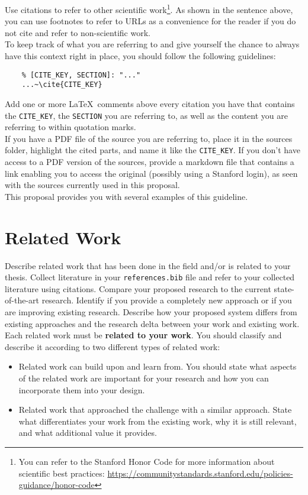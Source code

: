 \begin{tcolorbox}
	Use citations to refer to other scientific work\footnote{You can refer to the Stanford Honor Code for more information about scientific best practices: \url{https://communitystandards.stanford.edu/policies-guidance/honor-code}}.
	As shown in the sentence above, you can use footnotes to refer to URLs as a convenience for the reader if you do not cite and refer to non-scientific work.
	\\
	To keep track of what you are referring to and give yourself the chance to always have this context right in place, you should follow the following guidelines:
	\begin{verbatim}
	% [CITE_KEY, SECTION]: "..."
	...~\cite{CITE_KEY}
	\end{verbatim}
	Add one or more \LaTeX~comments above every citation you have that contains the \texttt{CITE\_KEY}, the \texttt{SECTION} you are referring to, as well as the content you are referring to within quotation marks.
	\\
	If you have a PDF file of the source you are referring to, place it in the sources folder, highlight the cited parts, and name it like the \texttt{CITE\_KEY}.
	If you don't have access to a PDF version of the sources, provide a markdown file that contains a link enabling you to access the original (possibly using a Stanford login), as seen with the sources currently used in this proposal.
	\\
	This proposal provides you with several examples of this guideline.
\end{tcolorbox}


\section*{Related Work}

\begin{tcolorbox}
	Describe related work that has been done in the field and/or is related to your thesis. 
	Collect literature in your \texttt{references.bib} file and refer to your collected literature using citations. 
	Compare your proposed research to the current state-of-the-art research.
	Identify if you provide a completely new approach or if you are improving existing research. 
	Describe how your proposed system differs from existing approaches and the research delta between your work and existing work.
	\\
	Each related work must be \textbf{related to your work}.
	You should classify and describe it according to two different types of related work:
	\begin{itemize}
		\item Related work can build upon and learn from. You should state what aspects of the related work are important for your research and how you can incorporate them into your design.
		\item Related work that approached the challenge with a similar approach. State what differentiates your work from the existing work, why it is still relevant, and what additional value it provides.	
	\end{itemize}
\end{tcolorbox}

